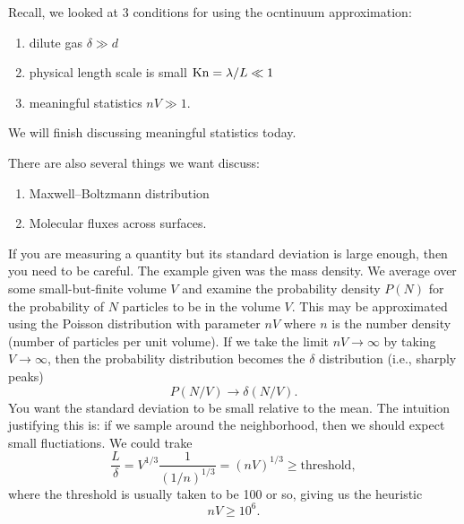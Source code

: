 
\lecture{}

\begin{node}
Recall, we looked at 3 conditions for using the ocntinuum
approximation:
\begin{enumerate}
\item dilute gas $\delta\gg d$
\item physical length scale is small $\mathrm{Kn}=\lambda/L\ll1$
\item meaningful statistics $nV\gg1$.
\end{enumerate}
We will finish discussing meaningful statistics today.
\end{node}

\begin{node}
  There are also several things we want discuss:
  \begin{enumerate}
  \item Maxwell--Boltzmann distribution
  \item Molecular fluxes across surfaces.
  \end{enumerate}
\end{node}

\begin{node}
If you are measuring a quantity but its standard deviation is large
enough, then you need to be careful. The example given was the mass
density. We average over some small-but-finite volume $V$ and examine
the probability density $P(N)$ for the probability of $N$ particles to
be in the volume $V$. This may be approximated using the Poisson
distribution with parameter $nV$ where $n$ is the number density
(number of particles per unit volume). If we take the limit
$nV\to\infty$ by taking $V\to\infty$, then the probability
distribution becomes the $\delta$ distribution (i.e., sharply peaks)
\begin{equation}
P(N/V)\to\delta(N/V).
\end{equation}
You want the standard deviation to be small relative to the mean. The
intuition justifying this is: if we sample around the neighborhood,
then we should expect small fluctiations. We could trake
\begin{equation}
\frac{L}{\delta}=V^{1/3}\frac{1}{(1/n)^{1/3}}=(nV)^{1/3}\geq\mbox{threshold},
\end{equation}
where the threshold is usually taken to be 100 or so, giving us the heuristic
\begin{equation}
nV\geq10^{6}.
\end{equation}
\end{node}

